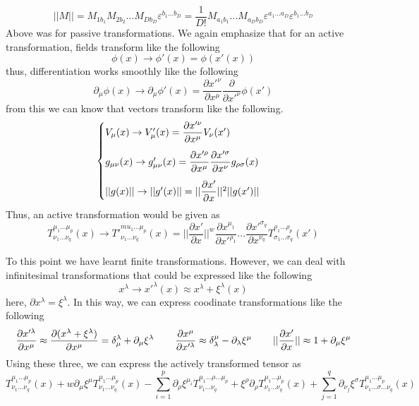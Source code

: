 \begin{recall}
\[||M||=M_{1b_1}M_{2b_2}\ldots M_{Db_{D}}\varepsilon ^{b_1\ldots b_{D}}=\dfrac{1}{D!}M_{a_1b_1}\ldots M_{a_{D}b_{D}}\varepsilon ^{a_1\ldots a_{D}}\varepsilon ^{b_1\ldots b_{D}}\]
Above was for passive transformations. We again emphasize that for an active transformation, fields transform like the following
\[\phi (x)\rightarrow \phi '(x)=\phi (x'(x))\]
thus, differentiation works smoothly like the following
\[\partial _{\mu }\phi (x)\rightarrow \partial _{\mu }\phi '(x)=\dfrac{\partial x'^{\nu }}{\partial x^{\mu }}\dfrac{\partial }{\partial x'^{\nu }}\phi (x')  \]
from this we can know that vectors transform like the following.
\[\begin{cases}
\vspace{2ex}V_{\mu }(x)\rightarrow V'_{\mu }(x)=\dfrac{\partial x'^{\nu }}{\partial x^{\mu }}V_{\nu }(x')\\\vspace{2ex}
g_{\mu \nu }(x)\rightarrow g'_{\mu \nu }(x)=\dfrac{\partial x'^{\rho }}{\partial x^{\mu }}\dfrac{\partial x'^{\sigma }}{\partial x^{\nu }}g_{\rho \sigma }(x)\\
||g(x)||\rightarrow ||g'(x)||=||\dfrac{\partial x'}{\partial x}||^2||g(x')|| 
\end{cases}\]
Thus, an active transformation would be given as
\[T^{\mu_1\ldots \mu _{p}}_{\nu_1\ldots \nu _{q}}(x)\rightarrow T'^{mu_1\ldots \mu _{p}}_{\nu_1\ldots \nu _{q}}(x)=||\dfrac{\partial x'}{\partial x}||^{w}\dfrac{\partial x^{\mu_1}}{\partial x'^{\rho_1}}\ldots \dfrac{\partial x'^{\sigma _{q}}}{\partial x^{\nu _{q}}}T^{\rho_1\ldots \rho _{p}}_{\sigma_1\ldots \sigma _{q}}(x')  \]
\end{recall}
To this point we have learnt finite transformations. However, we can deal with infinitesimal transformations that could be expressed like the following
\[x^{\lambda }\rightarrow x'^{\lambda }(x)\approx x^{\lambda }+\xi^{\lambda }(x)\]
here, $\partial x^{\lambda }=\xi^{\lambda }$. In this way, we can express coodinate transformations like the following
\[\dfrac{\partial x'^{\lambda }}{\partial x^{\mu }}\approx \dfrac{\partial (x^{\lambda }+\xi^{\lambda })}{\partial x^{\mu }}=\delta ^{\lambda }_{\mu }+\partial _{\mu }\xi^{\lambda } \hspace{5ex}\dfrac{\partial x^{\mu }}{\partial x'^{\lambda }}\approx \delta ^{\mu }_{\lambda }-\partial _{\lambda }\xi^{\mu }\hspace{5ex}||\dfrac{\partial x'}{\partial x}||\approx 1+\partial _{\mu }\xi^{\mu }   \]
Using these three, we can express the actively transformed tensor as 
\[T^{\mu_1\ldots \mu _{p}}_{\nu _1\ldots \nu _{q}}(x)+w\partial _{\mu }\xi^{\mu }T^{\mu_1\ldots \mu _{p}}_{\nu_1\ldots \nu_{q} }(x)-\sum^{p}_{i=1}\partial _{\rho }\xi  ^{\mu_{i}}T^{\mu_1\ldots \rho \ldots \mu _{p}}_{\nu_1\ldots \nu_{q}}+\xi^{\rho }\partial _{\rho }T^{\mu_1\ldots \mu _{p}}_{\nu_1\ldots \nu_{q}}(x)+\sum ^{q}_{j=1}\partial _{\nu _{j}}\xi^{\sigma }T^{\mu_1\ldots \mu _{p}}_{\nu_1\ldots \sigma \ldots \nu _{q}}(x) \]
